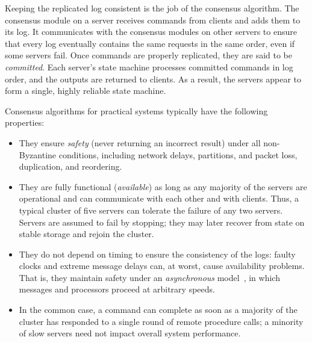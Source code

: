 Keeping the replicated log consistent is the job of the consensus
algorithm. The consensus
module on a server receives commands from clients and adds them to its log.
It communicates with the consensus modules on other servers to
ensure that every log eventually contains
the same requests in the
same order, even if some servers fail. Once commands are properly
replicated, they are said to be \emph{committed}. Each server's state machine processes
committed commands in log order, and the outputs are returned to clients.
As a result, the servers appear to
form a single, highly reliable state machine.

Consensus algorithms for practical systems typically have the following
properties:
\begin{itemize}
\item They ensure \emph{safety} (never returning an incorrect
result) under all non-Byzantine
conditions, including network delays,
partitions, and packet loss, duplication, and reordering.
\item They are
fully functional (\emph{available}) as long as any majority of the servers are
operational and can communicate with each other and with clients.
Thus, a typical cluster of five servers can tolerate the
failure of any two servers.
Servers are assumed to fail by stopping; they may later recover from
state on stable storage and rejoin the cluster.
\item They do not depend on timing to ensure the consistency
of the logs: faulty clocks and extreme message delays can, at worst,
cause availability problems. That is, they maintain safety under an
\emph{asynchronous} model~\cite{Lynch:1996}, in
which messages and processors proceed at arbitrary speeds.
\item In the common
case, a command can complete as soon as a majority of the cluster
has responded to a single round of remote procedure calls; a minority
of slow servers need not impact overall system performance.
\end{itemize}

